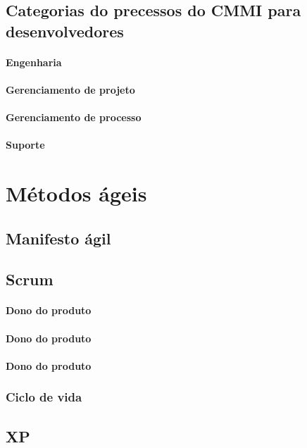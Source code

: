 \documentclass{article}
\begin{document}
\subsection{Categorias do precessos do CMMI para desenvolvedores}

\paragraph{Engenharia}
\paragraph{Gerenciamento de projeto}
\paragraph{Gerenciamento de processo}
\paragraph{Suporte}

\section{Métodos ágeis} \date{7 de Abril de 2014}

\subsection{Manifesto ágil}

\subsection{Scrum}
\paragraph{Dono do produto}
\paragraph{Dono do produto}
\paragraph{Dono do produto}

\subsubsection{Ciclo de vida}

\subsection{XP}
\end{document}
